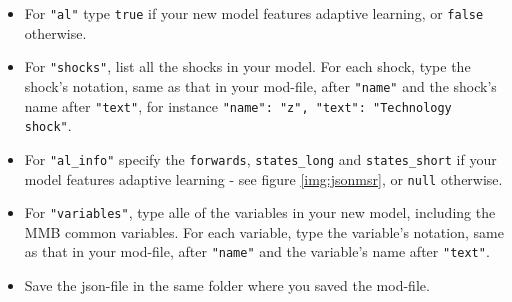 \begin{itemize}
\item For \texttt{"al"} type \texttt{true} if your new model features adaptive learning, or \texttt{false} otherwise.
\item For \texttt{"shocks"}, list all the shocks in your model. For each shock, type the shock's notation, same as that in your mod-file, after \texttt{"name"} and the shock's name after \texttt{"text"}, for instance \texttt{"name": "z", "text": "Technology shock"}.
\item For \texttt{"al\_info"} specify the \texttt{forwards}, \texttt{states\_long} and \texttt{states\_short} if your model features adaptive learning - see figure \ref{img:jsonmsr}, or \texttt{null} otherwise.
\item For \texttt{"variables"}, type alle of the variables in your new model, including the MMB common variables. For each variable, type the variable's notation, same as that in your mod-file, after \texttt{"name"} and the variable's name after \texttt{"text"}.
\item Save the json-file in the same folder where you saved the mod-file.

\end{itemize}




